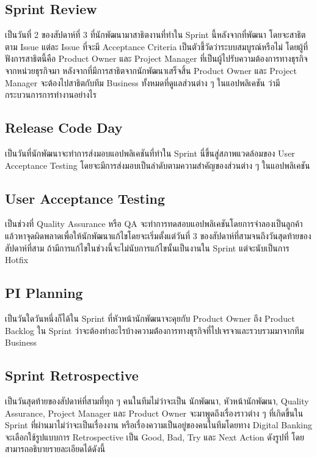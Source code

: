 \subsection{Sprint Review}
เป็นวันที่ 2 ของสัปดาห์ที่ 3 ที่นักพัฒนามาสาธิตงานที่ทำใน Sprint นี้หลังจากที่พัฒนา โดยจะสาธิตตาม Issue แต่ละ Issue ที่จะมี Acceptance Criteria 
เป็นตัวชี้วัดว่าระบบสมบูรณ์หรือไม่ โดยผู้ที่ฟังการสาธิตนี้คือ Product Owner และ Project Manager ที่เป็นผู้ไปรับความต้องการทางธุรกิจจากหน่วยธุรกิจมา
หลังจากที่มีการสาธิตจากนักพัฒนาเสร็จสิ้น Product Owner และ Project Manager จะต้องไปสาธิตกับทีม Business ทั้งหมดที่ดูแลส่วนต่าง ๆ ในแอปพลิเคชัน
ว่ามีกระบวนการการทำงานอย่างไร

\subsection{Release Code Day}
เป็นวันที่นักพัฒนาจะทำการส่งมอบแอปพลิเคชันที่ทำใน Sprint นี่ขึ้นสู่สภาพแวดล้อมของ 
User Acceptance Testing โดยจะมีการส่งมอบเป็นลำดับตามความสำคัญของส่วนต่าง ๆ ในแอปพลิเคชัน

\subsection{User Acceptance Testing}
เป็นช่วงที่ Quality Assurance หรือ QA จะทำการทดสอบแอปพลิเคชันโดยการจำลองเป็นลูกค้าแล้วหาจุดผิดพลาดเพื่อให้นักพัฒนาแก้ไขโดยจะเริ่มตั้งแต่วันที่ 3 ของสัปดาห์ที่สามจนถึงวันสุดท้ายของสัปดาห์ที่สาม
ถ้ามีการแก้ไขในช่วงนี้จะไม่นับการแก้ไขนั้นเป็นงานใน Sprint แต่จะนับเป็นการ Hotfix

\subsection{PI Planning}
เป็นวันใดวันหนึ่งก็ได้ใน Sprint ที่หัวหน้านักพัฒนาจะคุยกับ Product Owner ถึง Product Backlog ใน Sprint 
ว่าจะต้องทำอะไรบ้างความต่้องการทางธุรกิจที่ไปเจรจาและรวบรวมมาจากทีม Business
        
\subsection{Sprint Retrospective}
เป็นวันสุดท้ายของสัปดาห์ที่สามที่ทุก ๆ คนในทีมไม่ว่าจะเป็น นักพัฒนา, หัวหน้านักพัฒนา, Quality Assurance, Project Manager 
และ Product Owner จะมาพูดถึงเรื่องราวต่าง ๆ ที่เกิดขึ้นใน Sprint ที่ผ่านมาไม่ว่าจะเป็นเรื่องงาน 
หรือเรื่องความเป็นอยู่ของคนในทีมโดยทาง Digital Banking จะเลือกใช้รูปแบบการ 
Retrospective เป็น Good, Bad, Try และ Next Action ดังรูปที่
โดยสามารถอธิบายรายละเอียดได้ดังนี้
